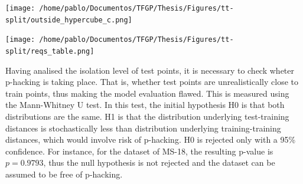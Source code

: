 %
\begin{table}[!htb]
	\centering
	\label{tab:outhypercube}
	\texttt{[image: /home/pablo/Documentos/TFGP/Thesis/Figures/tt-split/outside\_hypercube\_c.png]}
\end{table}
% 
\begin{table}[!htb]
	\centering
	\label{tab:reqsresults}
	\texttt{[image: /home/pablo/Documentos/TFGP/Thesis/Figures/tt-split/reqs\_table.png]}
\end{table}
%
\indent Having analised the isolation level of test points, it is necessary to check wheter p-hacking is taking place. That is, whether test points are unrealistically close to train points, thus making the model evaluation flawed. This is measured using the Mann-Whitney U test\cite{rosner1999use}. In this test, the initial hypothesis H0 is that both distributions are the same. H1 is that the distribution underlying test-training distances is stochastically less than distribution underlying training-training distances, which would involve risk of p-hacking. H0 is rejected only with a 95\% confidence. For instance, for the dataset of MS-18, the resulting p-value is $p=0.9793$, thus the null hypothesis is not rejected and the dataset can be assumed to be free of p-hacking.\\
%
